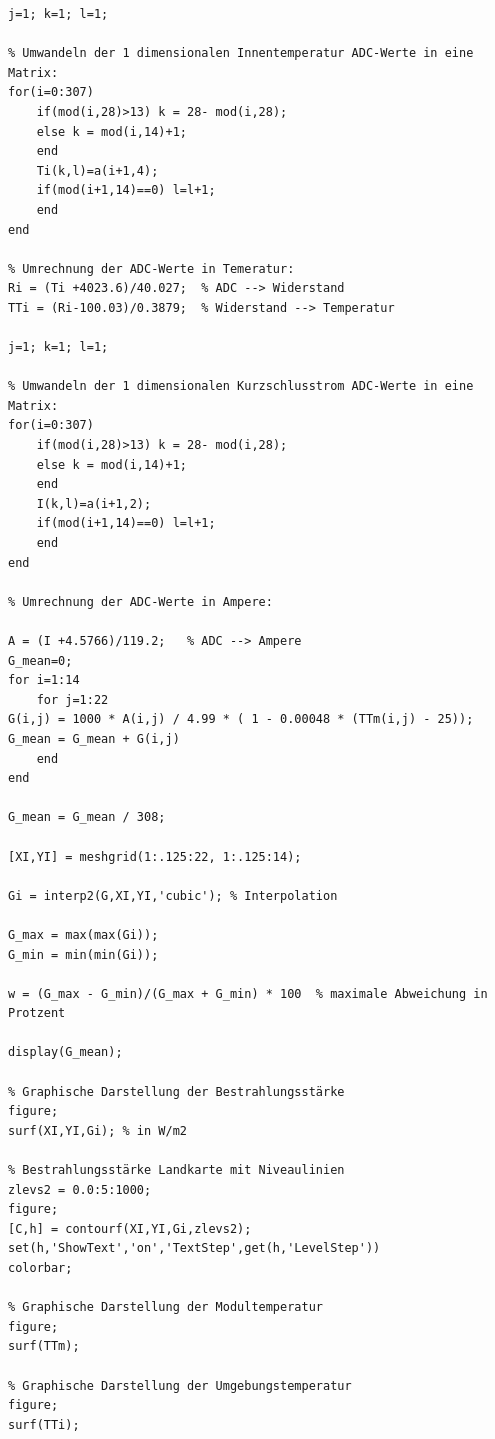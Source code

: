 \documentclass[a4paper,bibtotoc,oneside]{scrbook}
\begin{document}
\begin{appendix}
\begin{verbatim}
j=1; k=1; l=1;

% Umwandeln der 1 dimensionalen Innentemperatur ADC-Werte in eine Matrix:
for(i=0:307)
    if(mod(i,28)>13) k = 28- mod(i,28);
    else k = mod(i,14)+1;
    end
    Ti(k,l)=a(i+1,4);
    if(mod(i+1,14)==0) l=l+1;
    end
end

% Umrechnung der ADC-Werte in Temeratur:
Ri = (Ti +4023.6)/40.027;  % ADC --> Widerstand
TTi = (Ri-100.03)/0.3879;  % Widerstand --> Temperatur

j=1; k=1; l=1;

% Umwandeln der 1 dimensionalen Kurzschlusstrom ADC-Werte in eine Matrix:
for(i=0:307)
    if(mod(i,28)>13) k = 28- mod(i,28);
    else k = mod(i,14)+1;
    end
    I(k,l)=a(i+1,2);
    if(mod(i+1,14)==0) l=l+1;
    end
end

% Umrechnung der ADC-Werte in Ampere:

A = (I +4.5766)/119.2;   % ADC --> Ampere
G_mean=0;
for i=1:14
    for j=1:22
G(i,j) = 1000 * A(i,j) / 4.99 * ( 1 - 0.00048 * (TTm(i,j) - 25));
G_mean = G_mean + G(i,j)
    end
end

G_mean = G_mean / 308;

[XI,YI] = meshgrid(1:.125:22, 1:.125:14);

Gi = interp2(G,XI,YI,'cubic'); % Interpolation

G_max = max(max(Gi));
G_min = min(min(Gi));

w = (G_max - G_min)/(G_max + G_min) * 100  % maximale Abweichung in Protzent

display(G_mean);

% Graphische Darstellung der Bestrahlungsstärke
figure;
surf(XI,YI,Gi); % in W/m2

% Bestrahlungsstärke Landkarte mit Niveaulinien
zlevs2 = 0.0:5:1000;
figure;
[C,h] = contourf(XI,YI,Gi,zlevs2);
set(h,'ShowText','on','TextStep',get(h,'LevelStep'))
colorbar;

% Graphische Darstellung der Modultemperatur
figure;
surf(TTm); 

% Graphische Darstellung der Umgebungstemperatur
figure;
surf(TTi);  

\end{verbatim} 

\end{appendix}
\end{document}
